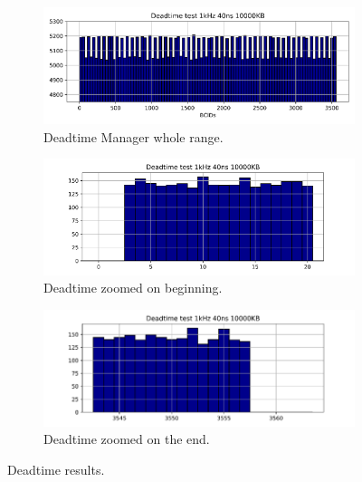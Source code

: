 \begin{figure}[htbp!] 
\centering    
    \begin{subfigure}[t]{1.0\textwidth}
    \includegraphics[width=1.0\textwidth]{DeadtimeManagerBig.png}
    \caption{Deadtime Manager whole range.}
    \label{fig:DeadtimeBig}
    \end{subfigure}
    \begin{subfigure}[t]{.4\textwidth}
    \includegraphics[width=1.0\textwidth]{DeadtimeManagerFront.png}
    \caption{Deadtime zoomed on beginning.}
    \label{fig:DeadtimeBeginning}
    \end{subfigure}
    \begin{subfigure}[t]{.4\textwidth}
    \includegraphics[width=1.0\textwidth]{DeadtimeManagerEnd.png}
    \caption{Deadtime zoomed on the end.}
    \label{fig:DeadtimeEnd}
    \end{subfigure}
\caption[Deadtime results histogram]{Deadtime results.}
\label{fig:DeadtimeManager}
\end{figure}

